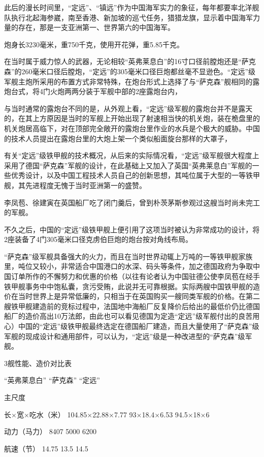 \documentclass[12pt,UTF8]{ctexbook}
\begin{document}
此后的漫长时间里，“定远”、“镇远”作为中国海军实力的象征，每年都要率北洋舰队执行北起海参崴，南至香港、新加坡的巡弋任务，猎猎龙旗，显示着中国海军力量的存在，那是一支亚洲第一、世界第六的中国海军。


炮身长3230毫米，重750千克，使用开花弹，重5.85千克。

在当时属于威力惊人的武器，无论相较“英弗莱息白”的16寸口径前膛炮还是“萨克森”的260毫米口径后膛炮，“定远”的305毫米口径巨炮都丝毫不显逊色。“定远”级军舰主炮所采用的布置方式非常特殊，在炮台形式上选择了与“萨克森”舰相同的露炮台式，将4门火炮两两分装于军舰中部的2座露炮台内，

与当时通常的露炮台不同的是，从外观上看，“定远”级军舰的露炮台并不是露天的，在其上方原因是当时的军舰上开始出现了射速相当快的机关炮，装在桅盘里的机关炮居高临下，对在顶部完全敞开的露炮台里作业的水兵是个极大的威胁。中国的技术人员提出在露炮台里的大炮上架一个类似船面旋台那样的大罩子，

有关“定远”级铁甲舰的技术概况，从后来的实际情况看，“定远”级军舰很大程度上采用了德国“萨克森”军舰的设计，在此基础上又加入了英国“英弗莱息白”军舰的一些优秀设计，以及中国工程技术人员自己的创新思想，其吨位属于大型的一等铁甲舰，其先进程度无愧于当时亚洲第一的盛赞。

李凤苞、徐建寅在英国船厂吃了闭门羹后，曾到朴茨茅斯参观过这艘当时尚未完工的军舰。

不久之后，中国的“定远”级铁甲舰上便引用了这项当时被认为非常成功的设计，将2座装备了4门305毫米口径克虏伯巨炮的炮台按对角线布局。

“萨克森”级军舰具备强大的火力，而且在当时世界动辄上万吨的一等铁甲舰家族里，吨位又较小，非常适合中国港口的水深、码头等条件，加之德国政府为争取中国订单所作的不懈努力和优惠的价格（以往有论者认为中国驻德公使李凤苞在经手铁甲舰事务中中饱私囊，贪污受贿，此说并无可靠根据。实际两艘中国铁甲舰的造价在当时世界上是异常低廉的，只相当于在英国购买一艘同类军舰的价格。在第二艘铁甲舰建造前的竞标过程中，法国地中海船厂反复降价后给出的最低价仍比德国船厂的造价高出10万法郎，由此也可以看见德国为定造“定远”级军舰付出的良苦用心）中国的“定远”级铁甲舰最终选定在德国船厂建造，而且大量使用了“萨克森”级军舰的现成设计和通用部件，可以认为，“定远”级是一种改进型的“萨克森”级军舰。

3舰性能、造价对比表

“英弗莱息白” “萨克森” “定远”

主尺度

长×宽×吃水（米） 104.85×22.88×7.77 93×18.4×6.53 94.5×18×6

动力（马力） 8407 5000 6200

航速（节） 14.75 13.5 14.5
\end{document}
